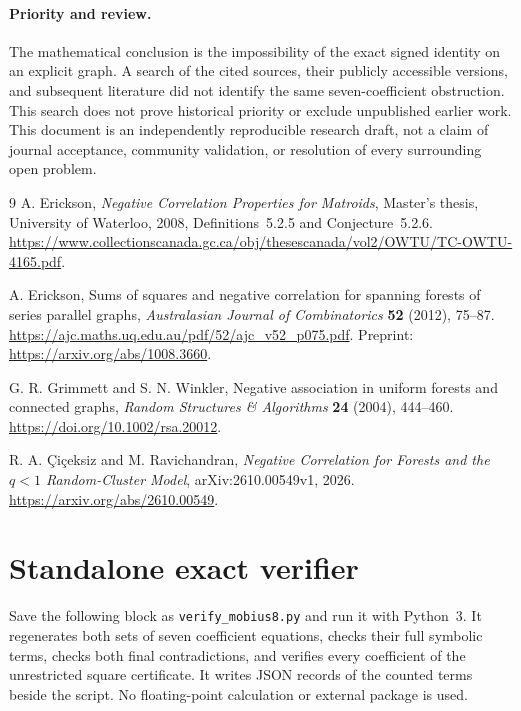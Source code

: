 \documentclass[11pt,a4paper]{article}
\begin{document}
\paragraph{Priority and review.}
The mathematical conclusion is the impossibility of the exact
signed identity on an explicit graph. A search of the cited sources,
their publicly accessible versions, and subsequent literature did
not identify the same seven-coefficient obstruction. This search
does not prove historical priority or exclude unpublished earlier
work. This document is an independently reproducible research
draft, not a claim of journal acceptance, community validation,
or resolution of every surrounding open problem.

\begin{thebibliography}{9}
A. Erickson,
\emph{Negative Correlation Properties for Matroids},
Master's thesis, University of Waterloo, 2008,
Definitions~5.2.5 and Conjecture~5.2.6.
\url{https://www.collectionscanada.gc.ca/obj/thesescanada/vol2/OWTU/TC-OWTU-4165.pdf}.

A. Erickson,
Sums of squares and negative correlation for spanning forests of
series parallel graphs,
\emph{Australasian Journal of Combinatorics} \textbf{52} (2012), 75--87.
\url{https://ajc.maths.uq.edu.au/pdf/52/ajc_v52_p075.pdf}.
Preprint: \url{https://arxiv.org/abs/1008.3660}.

G. R. Grimmett and S. N. Winkler,
Negative association in uniform forests and connected graphs,
\emph{Random Structures \& Algorithms} \textbf{24} (2004), 444--460.
\url{https://doi.org/10.1002/rsa.20012}.

R. A. \c{C}i\c{c}eksiz and M. Ravichandran,
\emph{Negative Correlation for Forests and the $q<1$ Random-Cluster Model},
arXiv:2610.00549v1, 2026.
\url{https://arxiv.org/abs/2610.00549}.
\end{thebibliography}

\clearpage
\appendix
\section{Standalone exact verifier}\label{app:code}
Save the following block as \texttt{verify\_mobius8.py} and run it
with Python~3. It regenerates both sets of seven coefficient equations,
checks their full symbolic terms, checks both final contradictions,
and verifies every coefficient of the unrestricted square certificate.
It writes JSON records of the counted terms beside the script. No floating-point
calculation or external package is used.
\end{document}
